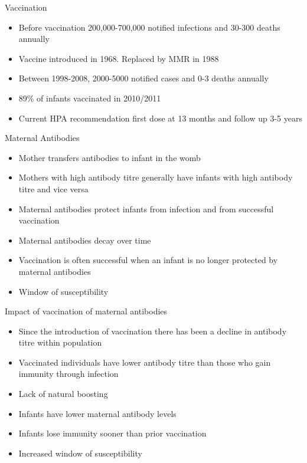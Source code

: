 \documentclass{beamer}
\begin{document}
\begin{frame} {Vaccination}
\begin{itemize}
\item {Before vaccination 200,000-700,000 notified infections and 30-300 deaths annually}
\item{Vaccine introduced in 1968. Replaced by MMR in 1988}
\item{Between 1998-2008, 2000-5000 notified cases and 0-3 deaths annually}
\item{89\% of infants vaccinated in 2010/2011}
\item{Current HPA recommendation first dose at 13 months and follow up 3-5 years}
\end{itemize}
\end{frame}

\begin{frame} {Maternal Antibodies}
\begin{itemize}
\item {Mother transfers antibodies to infant in the womb}
\item {Mothers with high antibody titre generally have infants with high antibody titre and vice versa}
\item {Maternal antibodies protect infants from infection and from successful vaccination}
\item {Maternal antibodies decay over time}
\item {Vaccination is often successful when an infant is no longer protected by maternal antibodies}
\item {Window of susceptibility}
\end{itemize}
\end{frame}

\begin{frame} {Impact of vaccination of maternal antibodies}
\begin{itemize}
\item{Since the introduction of vaccination there has been a decline in antibody titre within population}
\item {Vaccinated individuals have lower antibody titre than those who gain immunity through infection}
\item {Lack of natural boosting}
\item{Infants have lower maternal antibody levels}
\item {Infants lose immunity sooner than prior vaccination}
\item {Increased window of susceptibility}
\end{itemize}
\end{frame}
\end{document}
